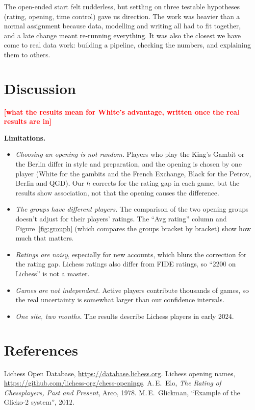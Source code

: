 \documentclass[11pt,a4paper]{article}
\newcommand{\TBD}[1]{\textcolor{red}{\textbf{[#1]}}}
\begin{document}
The open-ended start felt rudderless, but settling on three testable hypotheses (rating, opening, time control) gave us direction. The work was heavier than a normal assignment because data, modelling and writing all had to fit together, and a late change meant re-running everything. It was also the closest we have come to real data work: building a pipeline, checking the numbers, and explaining them to others.

\FloatBarrier
\section{Discussion}
\TBD{what the results mean for White's advantage, written once the real results are in}

\textbf{Limitations.}
\begin{itemize}
\item \emph{Choosing an opening is not random.} Players who play the King's Gambit or the
  Berlin differ in style and preparation, and the opening is chosen by one player (White for
  the gambits and the French Exchange, Black for the Petrov, Berlin and QGD). Our $h$
  corrects for the rating gap in each game, but the results show association, not that the
  opening causes the difference.
\item \emph{The groups have different players.} The comparison of the two opening groups doesn't
  adjust for their players' ratings. The ``Avg rating'' column and Figure~\ref{fig:grouph}
  (which compares the groups bracket by bracket) show how much that matters.
\item \emph{Ratings are noisy}, especially for new accounts, which blurs the correction for the
  rating gap. Lichess ratings also differ from FIDE ratings, so ``2200 on Lichess'' is not a
  master.
\item \emph{Games are not independent.} Active players contribute thousands of games, so the
  real uncertainty is somewhat larger than our confidence intervals.
\item \emph{One site, two months.} The results describe Lichess players in early 2024.
\end{itemize}

\section*{References}
{\small
Lichess Open Database, \url{https://database.lichess.org}.
Lichess opening names, \url{https://github.com/lichess-org/chess-openings}.
A.\,E.~Elo, \emph{The Rating of Chessplayers, Past and Present}, Arco, 1978.
M.\,E.~Glickman, ``Example of the Glicko-2 system'', 2012.
}
\end{document}
